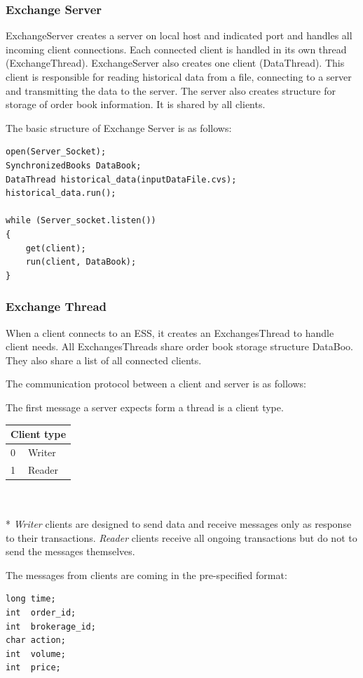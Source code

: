 \documentclass[14pt]{article}
\begin{document}
\subsubsection{Exchange Server}
ExchangeServer creates a server on local host and indicated port and handles all incoming client connections. Each connected client is handled in its own thread (ExchangeThread). ExchangeServer also creates one client (DataThread). This client is responsible for reading historical data from a file, connecting to a server and transmitting the data to the server. The server also creates structure for storage of order book information. It is shared by all clients.

The basic structure of Exchange Server is as follows:
\begin{verbatim}
open(Server_Socket);
SynchronizedBooks DataBook;
DataThread historical_data(inputDataFile.cvs);
historical_data.run();

while (Server_socket.listen())
{
	get(client);
	run(client, DataBook);
}
\end{verbatim}


\subsubsection{Exchange Thread}
When a client connects to an ESS, it creates an ExchangesThread to handle client needs. All ExchangesThreads share order book storage structure DataBoo. They also share a list of all connected clients.

The communication protocol between a client and server is as follows: 

The first message a server expects form a thread is a client type.

\begin{tabular}{|l|l|}
  \hline
  \multicolumn{2}{|c|}{Client type} \\
  \hline
  0 & Writer\\ \hline
  1 & Reader \\
  \hline
\end{tabular}
\\
\\*
\emph{Writer} clients are designed to send data and receive messages only as response to their transactions. \emph{Reader} clients receive all ongoing transactions but do not to send the messages themselves.

The messages from clients are coming in the pre-specified format:

\begin{verbatim}
long time;
int  order_id;
int  brokerage_id;
char action;
int  volume;
int  price;
\end{verbatim}
\end{document}
